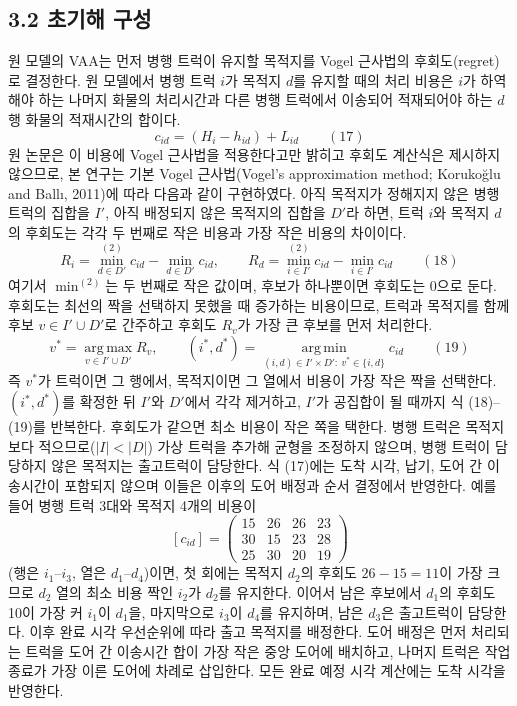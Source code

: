 \documentclass[10pt,a4paper]{article}
\begin{document}
\subsection{3.2 초기해 구성}
원 모델의 VAA는 먼저 병행 트럭이 유지할 목적지를 Vogel 근사법의
후회도(regret)로 결정한다. 원 모델에서 병행 트럭 $i$가 목적지 $d$를 유지할 때의 처리 비용은 $i$가 하역해야 하는
나머지 화물의 처리시간과 다른 병행 트럭에서 이송되어 적재되어야 하는 $d$행 화물의 적재시간의 합이다.
\[c_{id}=(H_i-h_{id})+L_{id} \qquad (17)\]
원 논문은 이 비용에 Vogel 근사법을 적용한다고만 밝히고 후회도 계산식은 제시하지 않으므로, 본 연구는 기본
Vogel 근사법(Vogel's approximation method; Korukoğlu and Ballı, 2011)에 따라 다음과 같이 구현하였다.
아직 목적지가 정해지지 않은 병행 트럭의 집합을 $I'$, 아직 배정되지 않은 목적지의 집합을 $D'$라 하면,
트럭 $i$와 목적지 $d$의 후회도는 각각 두 번째로 작은 비용과 가장 작은 비용의 차이이다.
\[R_i=\min^{(2)}_{d\in D'}c_{id}-\min_{d\in D'}c_{id},\qquad R_d=\min^{(2)}_{i\in I'}c_{id}-\min_{i\in I'}c_{id} \qquad (18)\]
여기서 $\min^{(2)}$는 두 번째로 작은 값이며, 후보가 하나뿐이면 후회도는 0으로 둔다. 후회도는 최선의 짝을 선택하지 못했을 때 증가하는 비용이므로, 트럭과 목적지를 함께 후보 $v\in I'\cup D'$로 간주하고 후회도 $R_v$가 가장 큰 후보를 먼저 처리한다.
\[v^*=\operatorname*{arg\,max}_{v\in I'\cup D'}R_v,\qquad (i^*,d^*)=\operatorname*{arg\,min}_{(i,d)\in I'\times D':\ v^*\in\{i,d\}}c_{id} \qquad (19)\]
즉 $v^*$가 트럭이면 그 행에서, 목적지이면 그 열에서 비용이 가장 작은 짝을 선택한다. $(i^*,d^*)$를 확정한 뒤 $I'$와 $D'$에서 각각 제거하고, $I'$가 공집합이 될 때까지 식 (18)--(19)를 반복한다. 후회도가 같으면
최소 비용이 작은 쪽을 택한다. 병행 트럭은 목적지보다 적으므로($|I|<|D|$) 가상 트럭을 추가해 균형을 조정하지 않으며, 병행 트럭이 담당하지 않은 목적지는 출고트럭이 담당한다. 식 (17)에는 도착 시각, 납기, 도어 간 이송시간이 포함되지 않으며 이들은 이후의 도어 배정과 순서 결정에서 반영한다. 예를 들어 병행 트럭 3대와 목적지 4개의
비용이
\[[c_{id}]=\begin{pmatrix}15&26&26&23\\30&15&23&28\\25&30&20&19\end{pmatrix}\]
(행은 $i_1$--$i_3$, 열은 $d_1$--$d_4$)이면, 첫 회에는 목적지 $d_2$의 후회도 $26-15=11$이 가장 크므로
$d_2$ 열의 최소 비용 짝인 $i_2$가 $d_2$를 유지한다. 이어서 남은 후보에서 $d_1$의 후회도 10이 가장 커 $i_1$이 $d_1$을,
마지막으로 $i_3$이 $d_4$를 유지하며, 남은 $d_3$은 출고트럭이 담당한다. 이후 완료 시각 우선순위에 따라 출고 목적지를 배정한다. 도어 배정은 먼저 처리되는
트럭을 도어 간 이송시간 합이 가장 작은 중앙 도어에 배치하고, 나머지 트럭은 작업 종료가 가장
이른 도어에 차례로 삽입한다. 모든 완료 예정 시각 계산에는 도착 시각을 반영한다.
\end{document}
